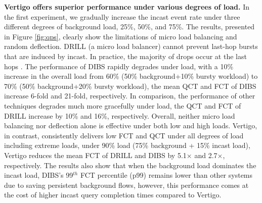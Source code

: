 \textbf{Vertigo offers superior performance under various degrees of load.}
In the first experiment, we gradually increase the incast event rate under three different degrees of background load, 25\%, 50\%, and 75\%.
The results, presented in Figure \ref{fig:qps}, clearly show the limitations of micro load balancing and random deflection. DRILL (a micro load balancer) cannot prevent last-hop bursts that are induced by incast. In practice, the majority of drops occur at the last hops \cite{jupiter, hpcc}. The performance of DIBS 
rapidly degrades under load, \eg with a 10\% increase in the overall load from 60\% (50\% background+10\% bursty workload) to 70\% (50\% background+20\% bursty workload), the mean QCT and FCT of DIBS increase 6-fold and 21-fold, respectively.
%  
In comparison, the performance of other techniques degrades much more gracefully under load, \eg the QCT and FCT of DRILL increase by 10\% and 16\%, respectively. Overall, neither micro load balancing nor deflection alone is effective under both low and high loads. Vertigo, in contrast, consistently delivers low FCT and QCT under all degrees of load including extreme loads, \eg under 90\% load (75\% background + 15\% incast load), Vertigo reduces the mean FCT of DRILL and DIBS by 5.1$\times$ and 2.7$\times$, respectively. The results also show that when the background load dominates the incast load, DIBS's 99$^{th}$ FCT percentile (p99) remains lower than other systems due to saving persistent background flows, however, this performance comes at the cost of higher incast query completion times compared to Vertigo.
%

